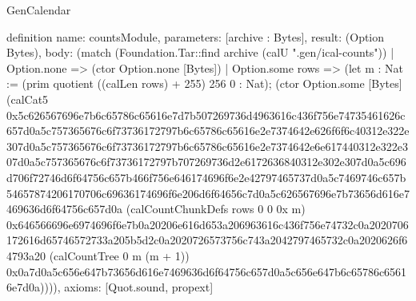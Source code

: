 \begin{lexlean}{GenCalendar}
\begin{semanticmodule}
definition{
  name: countsModule,
  parameters: [archive : Bytes],
  result: (Option Bytes),
  body: (match (Foundation.Tar::find archive (calU ".gen/ical-counts"))
    | Option.none => (ctor Option.none [Bytes])
    | Option.some rows => (let m : Nat := (prim quotient ((calLen rows) + 255) 256 0 : Nat); (ctor Option.some [Bytes] (calCat5 0x5c626567696e7b6c65786c65616e7d7b507269736d4963616c436f756e74735461626c657d0a5c757365676c6f73736172797b6c65786c65616e2e7374642e626f6f6c40312e322e307d0a5c757365676c6f73736172797b6c65786c65616e2e7374642e6e617440312e322e307d0a5c757365676c6f73736172797b707269736d2e6172636840312e302e307d0a5c696d706f72746d6f64756c657b466f756e646174696f6e2e42797465737d0a5c7469746c657b54657874206170706c69636174696f6e206d6f64656c7d0a5c626567696e7b73656d616e7469636d6f64756c657d0a (calCountChunkDefs rows 0 0 0x m) 0x646566696e6974696f6e7b0a20206e616d653a206963616c436f756e74732c0a2020706172616d65746572733a205b5d2c0a2020726573756c743a2042797465732c0a2020626f64793a20 (calCountTree 0 m (m + 1)) 0x0a7d0a5c656e647b73656d616e7469636d6f64756c657d0a5c656e647b6c65786c65616e7d0a)))),
  axioms: [Quot.sound, propext]
}
\end{semanticmodule}
\end{lexlean}
